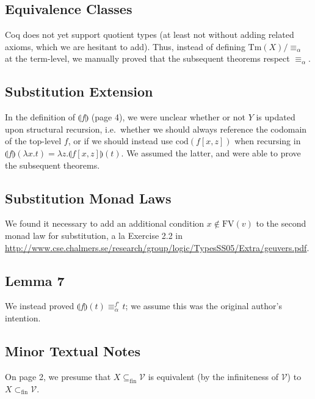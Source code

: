 \documentclass{article}
\begin{document}
\subsection{Equivalence Classes}

Coq does not yet support quotient types (at least not without adding related axioms, which we are
hesitant to add). Thus, instead of defining $\textrm{Tm}(X)/\equiv_\alpha$ at the term-level, we
manually proved that the subsequent theorems respect $\equiv_\alpha$.

\subsection{Substitution Extension}

In the definition of $\llparenthesis f \rrparenthesis$ (page 4), we were unclear whether or not $Y$
is updated upon structural recursion, i.e.\ whether we should always reference the codomain of the
top-level $f$, or if we should instead use $\textrm{cod}(f[x,z])$ when recursing in $\llparenthesis
f \rrparenthesis(\lambda x. t) = \lambda z. \llparenthesis f[x,z] \rrparenthesis (t)$. We assumed
the latter, and were able to prove the subsequent theorems.

\subsection{Substitution Monad Laws}

We found it necessary to add an additional condition $x \notin \textrm{FV}(v)$ to the second monad
law for substitution, a la Exercise 2.2 in
\url{http://www.cse.chalmers.se/research/group/logic/TypesSS05/Extra/geuvers.pdf}.

\subsection{Lemma 7}

We instead proved $\llparenthesis f \rrparenthesis (t) \equiv_\alpha^{f^\circ} t$; we assume this
was the original author's intention.

\subsection{Minor Textual Notes}

On page 2, we presume that $X \subseteq_{\textrm{fin}} \mathcal{V}$ is equivalent (by the
infiniteness of $\mathcal{V}$) to $X \subset_{\textrm{fin}} \mathcal{V}$.
\end{document}
